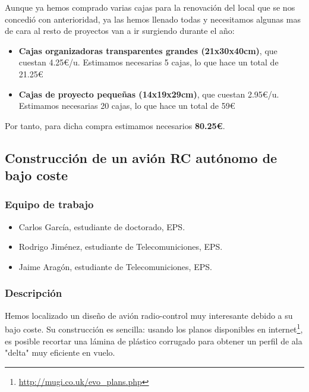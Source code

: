 \documentclass[12pt,twoside]{report}
\begin{document}
Aunque ya hemos comprado varias cajas para la renovación del local que se nos concedió con anterioridad, ya las hemos llenado todas y necesitamos algunas mas de cara al resto de proyectos van a ir surgiendo durante el año:

\begin{itemize}
\item \textbf{Cajas organizadoras transparentes grandes (21x30x40cm)}, que cuestan 4.25\euro{}/u. Estimamos necesarias 5 cajas, lo que hace un total de 21.25\euro{}
\item \textbf{Cajas de proyecto pequeñas (14x19x29cm)}, que cuestan 2.95\euro{}/u. Estimamos necesarias 20 cajas, lo que hace un total de 59\euro{}
\end{itemize}

Por tanto, para dicha compra estimamos necesarios \textbf{80.25\euro{}}.




\subsection{Construcción de un avión RC autónomo de bajo coste}

\subsubsection{Equipo de trabajo}
\begin{itemize}
\item Carlos García, estudiante de doctorado, EPS.
\item Rodrigo Jiménez, estudiante de Telecomuniciones, EPS.
\item Jaime Aragón, estudiante de Telecomuniciones, EPS.
\end{itemize}
\subsubsection{Descripción}
Hemos localizado un diseño de avión radio-control muy interesante debido a su bajo coste. Su construcción es sencilla: usando los planos disponibles en internet\footnote{\url{http://mugi.co.uk/evo_plans.php}}, es posible recortar una lámina de plástico corrugado para obtener un perfil de ala "delta" muy eficiente en vuelo.
\end{document}

